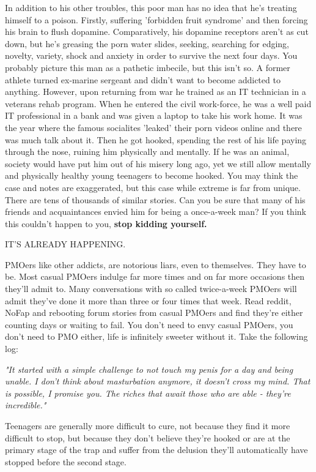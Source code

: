 \documentclass[easypeasy]{subfiles}
\begin{document}
In addition to his other troubles, this poor man has no idea that he's treating himself to a poison. Firstly, suffering 'forbidden fruit syndrome' and then forcing his brain to flush dopamine. Comparatively, his dopamine receptors aren't as cut down, but he's greasing the porn water slides, seeking, searching for edging, novelty, variety, shock and anxiety in order to survive the next four days. You probably picture this man as a pathetic imbecile, but this isn't so. A former athlete turned ex-marine sergeant and didn't want to become addicted to anything. However, upon returning from war he trained as an IT technician in a veterans rehab program. When he entered the civil work-force, he was a well paid IT professional in a bank and was given a laptop to take his work home. It was the year where the famous socialites 'leaked' their porn videos online and there was much talk about it. Then he got hooked, spending the rest of his life paying through the nose, ruining him physically and mentally. If he was an animal, society would have put him out of his misery long ago, yet we still allow mentally and physically healthy young teenagers to become hooked. You may think the case and notes are exaggerated, but this case while extreme is far from unique. There are tens of thousands of similar stories. Can you be sure that many of his friends and acquaintances envied him for being a once-a-week man? If you think this couldn't happen to you, \textbf{stop kidding yourself.}

{\huge IT'S ALREADY HAPPENING.}

PMOers like other addicts, are notorious liars, even to themselves. They have to be. Most casual PMOers indulge far more times and on far more occasions then they'll admit to. Many conversations with so called twice-a-week PMOers will admit they've done it more than three or four times that week. Read reddit, NoFap and rebooting forum stories from casual PMOers and find they're either counting days or waiting to fail. You don't need to envy casual PMOers, you don't need to PMO either, life is infinitely sweeter without it. Take the following log:

  \textit{"It started with a simple challenge to not touch my penis for a day and being unable. I don't think about masturbation anymore, it doesn't cross my mind. That is possible, I promise you. The riches that await those who are able - they're incredible."}

Teenagers are generally more difficult to cure, not because they find it more difficult to stop, but because they don't believe they're hooked or are at the primary stage of the trap and suffer from the delusion they'll automatically have stopped before the second stage.
\end{document}
